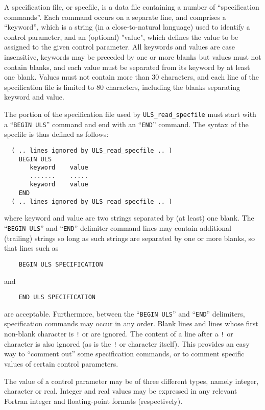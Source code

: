 \documentclass{galahad}
\newcommand{\packagename}{ULS}
\begin{document}
A specification file, or specfile, is a data file containing a number of
``specification commands''. Each command occurs on a separate line,
and comprises a ``keyword'',
which is a string (in a close-to-natural language) used to identify a
control parameter, and
an (optional) "value", which defines the value to be assigned to the given
control parameter. All keywords and values are case insensitive,
keywords may be preceded by one or more blanks but
values must not contain blanks, and
each value must be separated from its keyword by at least one blank.
Values must not contain more than 30 characters, and
each line of the specification file is limited to 80 characters,
including the blanks separating keyword and value.

The portion of the specification file used by
{\tt \packagename\_read\_specfile}
must start
with a ``{\tt BEGIN \packagename}'' command and end with an
``{\tt END}'' command.  The syntax of the specfile is thus defined as follows:
\begin{verbatim}
  ( .. lines ignored by ULS_read_specfile .. )
    BEGIN ULS
       keyword    value
       .......    .....
       keyword    value
    END
  ( .. lines ignored by ULS_read_specfile .. )
\end{verbatim}
where keyword and value are two strings separated by (at least) one blank.
The ``{\tt BEGIN \packagename}'' and ``{\tt END}'' delimiter command lines
may contain additional (trailing) strings so long as such strings are
separated by one or more blanks, so that lines such as
\begin{verbatim}
    BEGIN ULS SPECIFICATION
\end{verbatim}
and
\begin{verbatim}
    END ULS SPECIFICATION
\end{verbatim}
are acceptable. Furthermore,
between the
``{\tt BEGIN \packagename}'' and ``{\tt END}'' delimiters,
specification commands may occur in any order.  Blank lines and
lines whose first non-blank character is {\tt !} or {\tt *} are ignored.
The content
of a line after a {\tt !} or {\tt *} character is also
ignored (as is the {\tt !} or {\tt *}
character itself). This provides an easy way to ``comment out'' some
specification commands, or to comment specific values
of certain control parameters.

The value of a control parameter may be of three different types, namely
integer, character or real.
Integer and real values may be expressed in any relevant Fortran integer and
floating-point formats (respectively).
\end{document}
